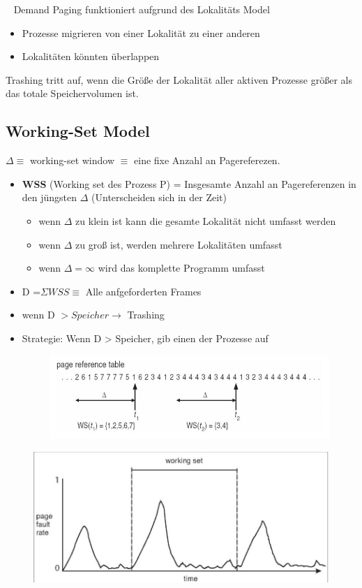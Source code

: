 \documentclass[a4paper]{scrreprt}
\begin{document}
\ \newline
Demand Paging funktioniert aufgrund des Lokalitäts Model
\begin{itemize}
\item Prozesse migrieren von einer Lokalität zu einer anderen
\item Lokalitäten könnten überlappen
\end{itemize}
Trashing tritt auf, wenn die Größe der Lokalität aller aktiven Prozesse größer als das totale Speichervolumen ist.

\subsection{Working-Set Model} 
$\Delta \equiv$ working-set window $\equiv$ eine fixe Anzahl an Pagereferezen.

\begin{itemize}
\item \textbf{WSS} (Working set des Prozess P) = Insgesamte Anzahl an Pagereferenzen in den jüngsten $\Delta$ (Unterscheiden sich in der Zeit)
\begin{itemize}
\item wenn $\Delta$ zu klein ist kann die gesamte Lokalität nicht umfasst werden
\item wenn $\Delta$ zu groß ist, werden mehrere Lokalitäten umfasst
\item wenn $\Delta = \infty$ wird das komplette Programm umfasst
\end{itemize}
\item D =$\Sigma WSS \equiv$ Alle anfgeforderten Frames
\item wenn D $> Speicher \rightarrow$ Trashing
\item Strategie: Wenn D > Speicher, gib einen der Prozesse auf

\begin{figure}[ht]
\centering
\includegraphics[scale=0.5]{graphics/workingset1.png}
\end{figure}
\end{itemize}

\begin{figure}[ht]
\centering
\includegraphics[scale=0.5]{graphics/workingset2.png}
\end{figure}
\end{document}
